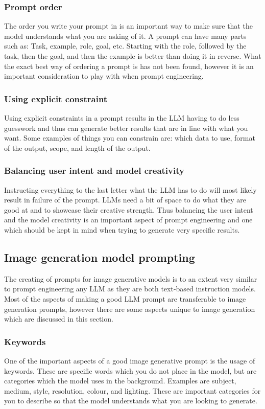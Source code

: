 \subsubsection*{Prompt order}
The order you write your prompt in is an important way to make sure that the model understands what you are asking of it. A prompt can have many parts such as: Task, example, role, goal, etc. Starting with the role, followed by the task, then the goal, and then the example is better than doing it in reverse. What the exact best way of ordering a prompt is has not been found, however it is an important consideration to play with when prompt engineering.
\subsubsection*{Using explicit constraint}
Using explicit constraints in a prompt results in the LLM having to do less guesswork and thus can generate better results that are in line with what you want. Some examples of things you can constrain are: which data to use, format of the output, scope, and length of the output.
\subsubsection*{Balancing user intent and model creativity}
Instructing everything to the last letter what the LLM has to do will most likely result in failure of the prompt. LLMs need a bit of space to do what they are good at and to showcase their creative strength. Thus balancing the user intent and the model creativity is an important aspect of prompt engineering and one which should be kept in mind when trying to generate very specific results.

\subsection{Image generation model prompting}
The creating of prompts for image generative models is to an extent very similar to prompt engineering any LLM as they are both text-based instruction models. Most of the aspects of making a good LLM prompt are transferable to image generation prompts, however there are some aspects unique to image generation which are discussed in this section.
\subsubsection*{Keywords}
One of the important aspects of a good image generative prompt is the usage of keywords. These are specific words which you do not place in the model, but are categories which the model uses in the background. Examples are subject, medium, style, resolution, colour, and lighting. These are important categories for you to describe so that the model understands what you are looking to generate.
